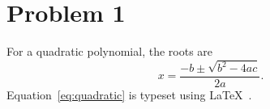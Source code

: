 \section{Problem 1}
For a quadratic polynomial, the roots are
\begin{equation}
  x = \frac{-b \pm \sqrt{b^2-4ac}}{2a}.
  \label{eq:quadratic}
\end{equation}
Equation~\eqref{eq:quadratic} is typeset using \LaTeX{}~\cite{lamport1994}.
